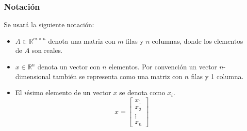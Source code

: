 \documentclass[10pt]{beamer}
\begin{document}
\begin{frame}
    \frametitle{Notación}
    Se usará la siguiente notación:
    \begin{itemize}
        \item $A \in \mathbb{R}^{m\times n}$ denota una matriz con $m$ filas y $n$ columnas, donde los elementos de $A$ son reales.
        \item $x \in \mathbb{R}^n$ denota un vector con $n$ elementos. Por convención un vector $n$-dimensional también se representa como una matriz con $n$ filas y 1 columna.
        \item El $i$ésimo elemento de un vector $x$ se denota como $x_i$.
            \begin{equation}
                x = \begin{bmatrix}
                    x_1 \\
                    x_2 \\
                    \vdots \\
                    x_n
                \end{bmatrix}
            \end{equation}
    \end{itemize}
\end{frame}
\end{document}
